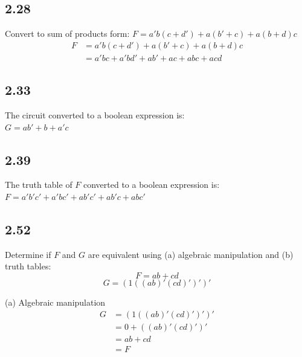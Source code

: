 \documentclass{article}
\begin{document}
\subsection*{2.28}
Convert to sum of products form: $F = a'b(c + d') + a(b' + c) + a(b + d)c$
\begin{align*}
    F &= a'b(c + d') + a(b' + c) + a(b + d)c \\
    &= a'bc + a'bd' + ab' + ac + abc + acd
\end{align*}

\subsection*{2.33}
The circuit converted to a boolean expression is: \\
$ G = ab' + b + a'c $

\subsection*{2.39}
The truth table of $F$ converted to a boolean expression is: \\
$ F = a'b'c' + a'bc' + ab'c' + ab'c + abc' $

\subsection*{2.52}
Determine if $F$ and $G$ are equivalent using (a) algebraic manipulation and (b) truth tables: \\
$$ F = ab + cd $$
$$ G = (1((ab)'(cd)')')' $$

\noindent (a) Algebraic manipulation \\
\begin{align*}
    G &= (1((ab)'(cd)')')' \\
    &= 0 + ((ab)'(cd)')' \\
    &= ab + cd \\
    &= F
\end{align*}
\end{document}
